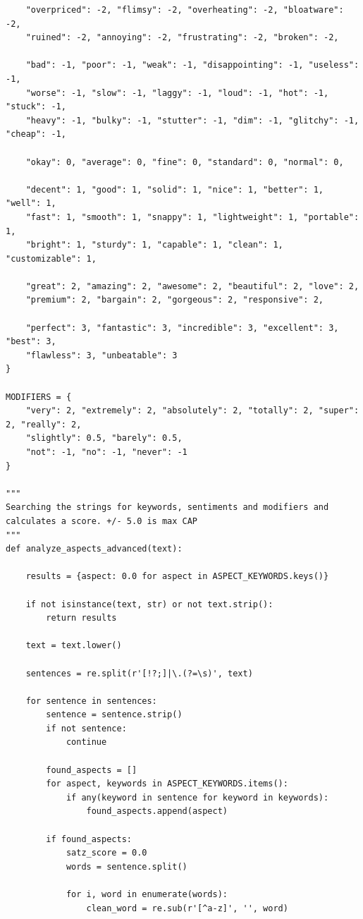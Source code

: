 \documentclass[12pt]{article}
\begin{document}
\begin{lstlisting}
    "overpriced": -2, "flimsy": -2, "overheating": -2, "bloatware": -2, 
    "ruined": -2, "annoying": -2, "frustrating": -2, "broken": -2,
    
    "bad": -1, "poor": -1, "weak": -1, "disappointing": -1, "useless": -1, 
    "worse": -1, "slow": -1, "laggy": -1, "loud": -1, "hot": -1, "stuck": -1, 
    "heavy": -1, "bulky": -1, "stutter": -1, "dim": -1, "glitchy": -1, "cheap": -1,
    
    "okay": 0, "average": 0, "fine": 0, "standard": 0, "normal": 0,
    
    "decent": 1, "good": 1, "solid": 1, "nice": 1, "better": 1, "well": 1, 
    "fast": 1, "smooth": 1, "snappy": 1, "lightweight": 1, "portable": 1, 
    "bright": 1, "sturdy": 1, "capable": 1, "clean": 1, "customizable": 1,
    
    "great": 2, "amazing": 2, "awesome": 2, "beautiful": 2, "love": 2, 
    "premium": 2, "bargain": 2, "gorgeous": 2, "responsive": 2,
    
    "perfect": 3, "fantastic": 3, "incredible": 3, "excellent": 3, "best": 3, 
    "flawless": 3, "unbeatable": 3
}

MODIFIERS = {
    "very": 2, "extremely": 2, "absolutely": 2, "totally": 2, "super": 2, "really": 2,
    "slightly": 0.5, "barely": 0.5,
    "not": -1, "no": -1, "never": -1
}

"""
Searching the strings for keywords, sentiments and modifiers and calculates a score. +/- 5.0 is max CAP
"""
def analyze_aspects_advanced(text):

    results = {aspect: 0.0 for aspect in ASPECT_KEYWORDS.keys()}
    
    if not isinstance(text, str) or not text.strip():
        return results

    text = text.lower()
    
    sentences = re.split(r'[!?;]|\.(?=\s)', text)
    
    for sentence in sentences:
        sentence = sentence.strip()
        if not sentence:
            continue
            
        found_aspects = []
        for aspect, keywords in ASPECT_KEYWORDS.items():
            if any(keyword in sentence for keyword in keywords):
                found_aspects.append(aspect)
                
        if found_aspects:
            satz_score = 0.0
            words = sentence.split()
            
            for i, word in enumerate(words):
                clean_word = re.sub(r'[^a-z]', '', word)
                

\end{lstlisting}
\end{document}
